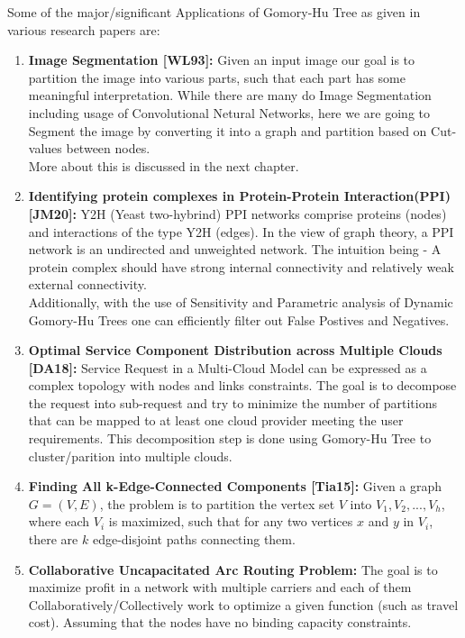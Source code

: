     \vspace{5mm}
    Some of the major/significant Applications of Gomory-Hu Tree as given in various research papers are:
    \begin{enumerate}
        \item {
            \textbf{Image Segmentation [WL93]:} Given an input image our goal is to partition the image into various parts, such that each part has some meaningful interpretation. While there are many do Image Segmentation including usage of Convolutional Netural Networks, here we are going to Segment the image by converting it into a graph and partition based on Cut-values between nodes. \\ 
            More about this is discussed in the next chapter.
        }

        \item {
            \textbf{Identifying protein complexes in Protein-Protein Interaction(PPI) [JM20]:} Y2H (Yeast two-hybrind) PPI networks comprise proteins (nodes) and interactions of the type Y2H (edges). In the view of graph theory, a PPI network is an undirected and unweighted network. The intuition being - A protein complex should have strong internal connectivity and relatively weak external connectivity. \\
            Additionally, with the use of Sensitivity and Parametric analysis of Dynamic Gomory-Hu Trees one can efficiently filter out False Postives and Negatives. 
        }

        \item{
            \textbf{Optimal Service Component Distribution across Multiple Clouds [DA18]:} Service Request in a Multi-Cloud Model can be expressed as a complex topology with nodes and links constraints. The goal is to decompose the request into sub-request and try to minimize the number of partitions that can be mapped to at least one cloud provider meeting the user requirements. This decomposition step is done using Gomory-Hu Tree to cluster/parition into multiple clouds.
        }

        \item{
            \textbf{Finding All k-Edge-Connected Components [Tia15]:} Given a graph $G = (V, E)$, the problem is to partition the vertex set $V$ into ${V_1,V_2,. . ., V_h}$, where each $V_i$ is maximized, such that for any two vertices $x$ and $y$ in $V_i$, there are $k$ edge-disjoint paths connecting them.
        }

        \item{
            \textbf{Collaborative Uncapacitated Arc Routing Problem:} The goal is to maximize profit in a network with multiple carriers and each of them Collaboratively/Collectively work to optimize a given function (such as travel cost). Assuming that the nodes have no binding capacity constraints.
        }


\end{enumerate}
